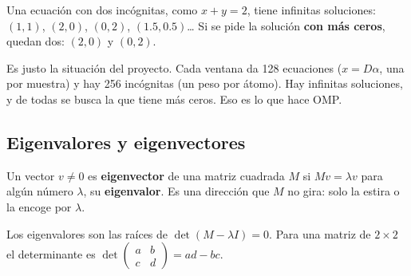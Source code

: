 \documentclass[11pt,letterpaper]{article}
\begin{document}
Una ecuación con dos incógnitas, como $x + y = 2$, tiene infinitas
soluciones: $(1, 1)$, $(2, 0)$, $(0, 2)$, $(1.5, 0.5)$\ldots{} Si se
pide la solución \textbf{con más ceros}, quedan dos: $(2, 0)$ y
$(0, 2)$.

\begin{idea}
    Es justo la situación del proyecto. Cada ventana da 128 ecuaciones
    ($x = D\alpha$, una por muestra) y hay 256 incógnitas (un peso por
    átomo). Hay infinitas soluciones, y de todas se busca la que tiene
    más ceros. Eso es lo que hace OMP.
\end{idea}

\subsection*{Eigenvalores y eigenvectores}

\begin{definicion}
    Un vector $v \neq 0$ es \textbf{eigenvector} de una matriz cuadrada
    $M$ si $M v = \lambda v$ para algún número $\lambda$, su
    \textbf{eigenvalor}. Es una dirección que $M$ no gira: solo la
    estira o la encoge por $\lambda$.
\end{definicion}

Los eigenvalores son las raíces de $\det(M - \lambda I) = 0$. Para una
matriz de $2 \times 2$ el determinante es
$\det\left(\begin{smallmatrix} a & b \\ c & d
\end{smallmatrix}\right) = ad - bc$.
\end{document}
